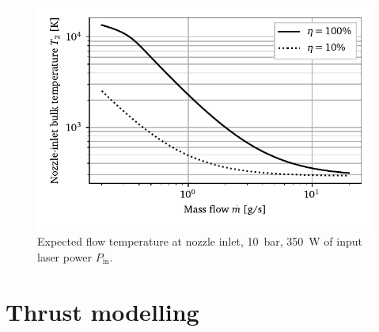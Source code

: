                 \begin{figure}[h]
                    \centering
                    \includegraphics[]{assets/4 models/heat_addition_flowing.pdf}
                    \caption{Expected flow temperature at nozzle inlet, \qty{10}{bar}, \qty{350}{W} of input laser power $P_\mathrm{in}$.}
                    \label{fig:heatdep_flowing}
                \end{figure}
    
    \section{Thrust modelling} \label{sec:model_thrust}